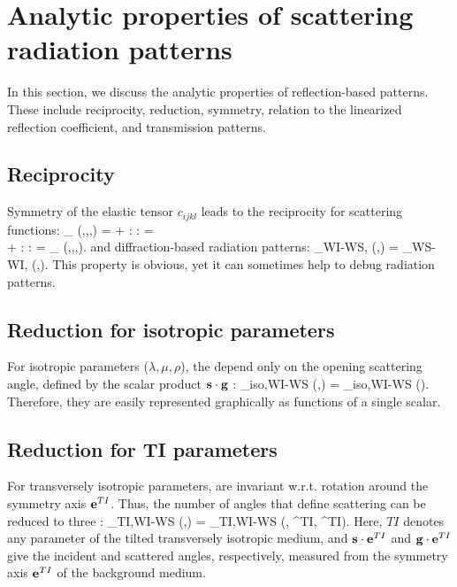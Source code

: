 \section{Analytic properties of scattering radiation patterns}
In this section, we discuss the analytic properties of reflection-based patterns. These include reciprocity, reduction, symmetry, relation to the linearized reflection coefficient, and transmission patterns.
\subsection{Reciprocity}
Symmetry of the elastic tensor $c_{ijkl}$ leads to the reciprocity 
for scattering functions:
\beq
\SF_{\delta\mv} (\sv,\spv,\gv,\gpv) = 
\spv \cdot \gpv \delta \rho + \sv \tmul \spv : \delta \cv : \gv \tmul \gpv = \\
\gpv \cdot \spv \delta \rho +  \gv \tmul \gpv : \delta \cv : \sv \tmul \spv = 
\SF_{\delta\mv} (\gv,\gpv,\sv,\spv). 
\eeq
and diffraction-based radiation patterns:
\beq
\Dp_{WI-WS,\delta\mv} (\sv,\gv) = \Dp_{WS-WI,\delta\mv} (\gv,\sv).
\eeq 
This property is obvious, yet it can sometimes help to debug radiation patterns. 

\subsection{Reduction for isotropic parameters}
For isotropic parameters ($\lambda, \mu, \rho$), the \dP depend only on the 
opening scattering angle, defined by the scalar product $\mathbf{s}\cdot\mathbf{g}$ \citep[e.g.,][]{wu1985}: 
\beq
\Dp_{iso,WI-WS} (\sv,\gv) = \Dp_{iso,WI-WS} (\sv \cdot \gv).
\eeq
Therefore, they are easily represented graphically as functions of a single scalar. 

\subsection{Reduction for TI parameters}
For transversely isotropic parameters, \dP are invariant w.r.t. rotation around 
the symmetry axis $\mathbf{e}^{TI}$. Thus, the number of angles that 
define scattering can be reduced to three \citep{calvet2006}:
\beq
\Dp_{TI,WI-WS} (\sv,\gv) = \Dp_{TI,WI-WS} (\sv \cdot \gv, \sv \cdot \ev^{TI}, \gv 
\cdot \ev^{TI}).
\eeq
Here, $TI$ denotes any parameter of the tilted transversely isotropic medium, and $\mathbf{s} \cdot \mathbf{e}^{TI}$ and $\mathbf{g} 
\cdot \mathbf{e}^{TI}$ give the incident and scattered angles, respectively, measured from the symmetry axis $\mathbf{e}^{TI}$ of the background medium.

